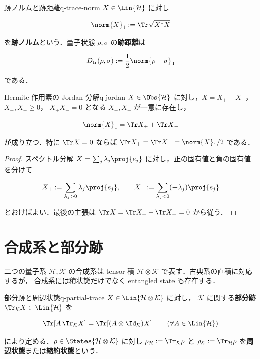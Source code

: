 \begin{definition}{跡ノルムと跡距離}{q-trace-norm}
  $X\in\Lin{\mathcal{H}}$ に対し

  \[
    \norm{X}_1:=\Tr\sqrt{X^*X}
  \]

  を\textbf{跡ノルム}という．量子状態 $\rho,\sigma$ の\textbf{跡距離}は

  \[
    D_{\rm tr}(\rho,\sigma):=\frac12\norm{\rho-\sigma}_1
  \]

  である．
\end{definition}

\begin{lemma}{Hermite 作用素の Jordan 分解}{q-jordan}
  $X\in\Obs{\mathcal{H}}$ に対し，$X=X_+-X_-$，$X_+,X_-\geq0$，
  $X_+X_-=0$ となる $X_+,X_-$ が一意に存在し，

  \[
    \norm{X}_1=\Tr X_+ + \Tr X_-
  \]

  が成り立つ．特に $\Tr X=0$ ならば
  $\Tr X_+=\Tr X_-=\norm{X}_1/2$ である．
\end{lemma}

\begin{proof}
  スペクトル分解 $X=\sum_j\lambda_j\proj{e_j}$ に対し，正の固有値と負の固有値を分けて

  \[
    X_+:=\sum_{\lambda_j>0}\lambda_j\proj{e_j},
    \qquad
    X_-:=\sum_{\lambda_j<0}(-\lambda_j)\proj{e_j}
  \]

  とおけばよい．最後の主張は
  $\Tr X=\Tr X_+-\Tr X_-=0$ から従う．
\end{proof}

\section{合成系と部分跡}

二つの量子系 $\mathcal{H},\mathcal{K}$ の合成系は tensor 積
$\mathcal{H}\otimes\mathcal{K}$ で表す．古典系の直積に対応するが，
合成系には積状態だけでなく entangled state も存在する．

\begin{definition}{部分跡と周辺状態}{q-partial-trace}
  $X\in\Lin{\mathcal{H}\otimes\mathcal{K}}$ に対し，
  $\mathcal{K}$ に関する\textbf{部分跡} $\Tr_{\mathcal{K}}X\in\Lin{\mathcal{H}}$ を

  \[
    \Tr\!\left[A\,\Tr_{\mathcal{K}}X\right]
    =\Tr\!\left[(A\otimes\Id_{\mathcal{K}})X\right]
    \qquad
    (\forall A\in\Lin{\mathcal{H}})
  \]

  により定める．$\rho\in\States{\mathcal{H}\otimes\mathcal{K}}$ に対し
  $\rho_{\mathcal{H}}:=\Tr_{\mathcal{K}}\rho$ と
  $\rho_{\mathcal{K}}:=\Tr_{\mathcal{H}}\rho$ を\textbf{周辺状態}または\textbf{縮約状態}という．
\end{definition}

